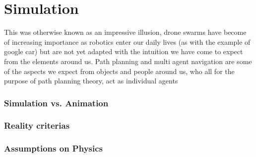 
\chapter{Simulation}
This was otherwise known as an impressive illusion, drone swarms have become of increasing importance as robotics enter our daily lives (as with the example of google car) but are not yet adapted with the intuition we have come to expect from the elements around us. Path planning and multi agent navigation are some of the aspects we expect from objects and people around us, who all for the purpose of path planning theory, act as individual agents 

\subsection{Simulation vs. Animation}

\subsection{Reality criterias}

\subsection{Assumptions on Physics}